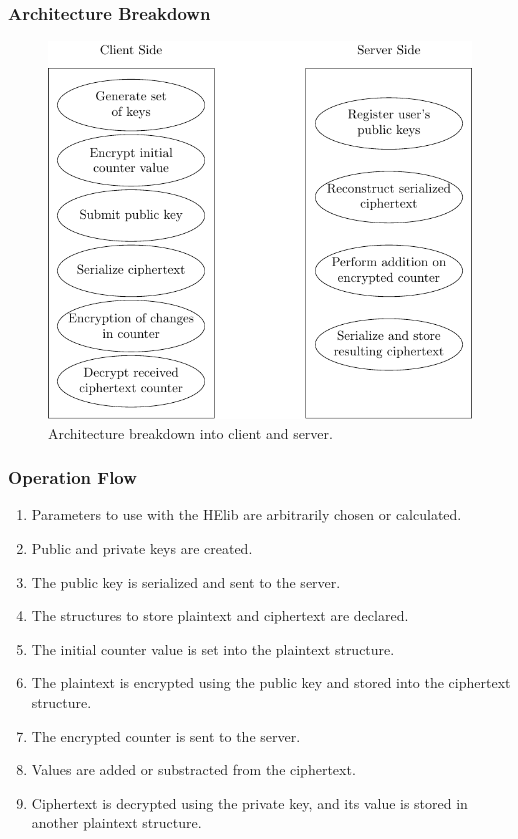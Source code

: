 \documentclass{beamer}
\begin{document}
\begin{frame}
\frametitle{Architecture Breakdown}
\begin{figure}[H]
  \centering
  \includegraphics[scale=0.6]{../img/architecture}
 \caption{Architecture breakdown into client and server.}
 \label{fig:clientserver}
\end{figure}

\end{frame}
\begin{frame}
\frametitle{Operation Flow}
\begin{enumerate}
	\item Parameters to use with the HElib are arbitrarily chosen or calculated.
	\item Public and private keys are created.
	\item The public key is serialized and sent to the server.
	\item The structures to store plaintext and ciphertext are declared.
	\item The initial counter value is set into the plaintext structure.
	\item The plaintext is encrypted using the public key and stored into the ciphertext structure.
        \item The encrypted counter is sent to the server.
	\item Values are added or substracted from the ciphertext.
	\item Ciphertext is decrypted using the private key, and its value is stored in another plaintext structure.
\end{enumerate}
\end{frame}
\end{document}
